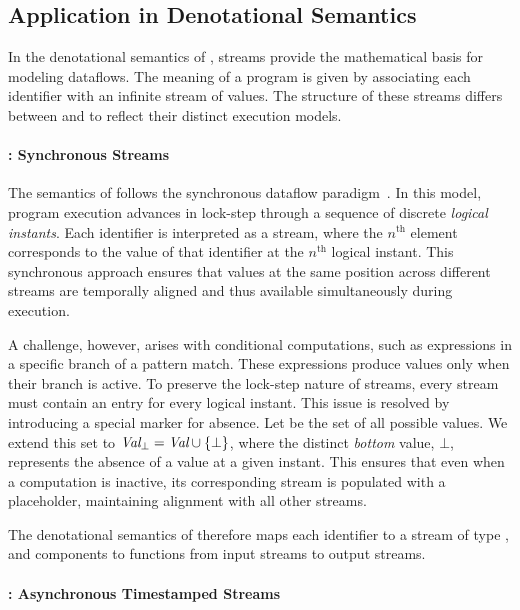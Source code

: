 \subsection{Application in Denotational Semantics}
\label{sec:semantics:streams:usage}

In the denotational semantics of \GRust, streams provide the mathematical basis for modeling
dataflows. The meaning of a program is given by associating each identifier with an infinite stream
of values. The structure of these streams differs between \GRSync and \GRFRP to reflect their
distinct execution models.

\paragraph{\GRSync: Synchronous Streams}

The semantics of \GRSync follows the synchronous dataflow paradigm~\cite{%
    DBLP:journals/tecs/BourkePP23,%
    DBLP:conf/ifip/Kahn74%
}. In this model, program execution advances in lock-step through a sequence of discrete
\emph{logical instants}. Each identifier is interpreted as a stream, where the $n^\text{th}$ element
corresponds to the value of that identifier at the $n^\text{th}$ logical instant. This synchronous
approach ensures that values at the same position across different streams are temporally aligned
and thus available simultaneously during execution.

A challenge, however, arises with conditional computations, such as expressions in a specific branch
of a pattern match. These expressions produce values only when their branch is active. To preserve
the lock-step nature of streams, every stream must contain an entry for every logical instant.
%
This issue is resolved by introducing a special marker for absence. Let \Val be the set of all
possible values. We extend this set to $\textit{Val}_\bot = \textit{Val} \cup \{\bot\}$, where the distinct
\emph{bottom} value, $\bot$, represents the absence of a value at a given instant. This ensures that
even when a computation is inactive, its corresponding stream is populated with a placeholder,
maintaining alignment with all other streams.

The denotational semantics of \GRSync therefore maps each identifier to a stream of type
\Stream{\ValBot}, and components to functions from input streams to output streams.

\paragraph{\GRFRP: Asynchronous Timestamped Streams}

